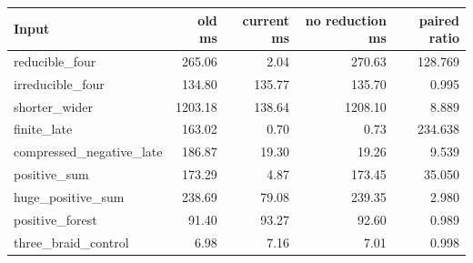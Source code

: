 \begin{center}
\begin{tabular}{@{}lrrrr@{}}
\toprule
Input & old ms & current ms & no reduction ms & paired ratio \\
\midrule
reducible\_four & 265.06 & 2.04 & 270.63 & 128.769 \\
irreducible\_four & 134.80 & 135.77 & 135.70 & 0.995 \\
shorter\_wider & 1203.18 & 138.64 & 1208.10 & 8.889 \\
finite\_late & 163.02 & 0.70 & 0.73 & 234.638 \\
compressed\_negative\_late & 186.87 & 19.30 & 19.26 & 9.539 \\
positive\_sum & 173.29 & 4.87 & 173.45 & 35.050 \\
huge\_positive\_sum & 238.69 & 79.08 & 239.35 & 2.980 \\
positive\_forest & 91.40 & 93.27 & 92.60 & 0.989 \\
three\_braid\_control & 6.98 & 7.16 & 7.01 & 0.998 \\
\bottomrule
\end{tabular}
\end{center}

